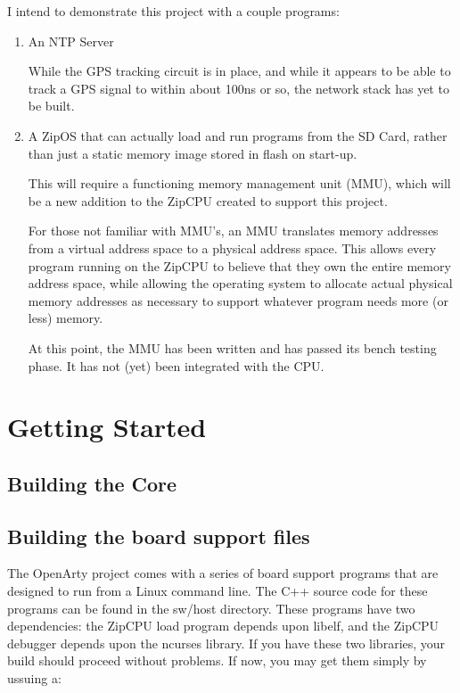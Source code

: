 \documentclass{gqtekspec}
\begin{document}
I intend to demonstrate this project with a couple programs:
\begin{enumerate}
\item An NTP Server

	While the GPS tracking circuit is in place, and while it appears to be
	able to track a GPS signal to within about 100ns or so, the 
	network stack has yet to be built.

\item A ZipOS that can actually load and run programs from the SD Card, rather
	than just a static memory image stored in flash on start-up.

	This will require a functioning memory management unit (MMU), which
	will be a new addition to the ZipCPU created to support this project.

	For those not familiar with MMU's, an MMU translates memory addresses
	from a virtual address space to a physical address space.  This allows
	every program running on the ZipCPU to believe that they own the entire
	memory address space, while allowing the operating system to allocate
	actual physical memory addresses as necessary to support whatever
	program needs more (or less) memory.

	At this point, the MMU has been written and has passed its bench
	testing phase.  It has not (yet) been integrated with the CPU.
\end{enumerate}


\chapter{Getting Started}\label{ch:getting-started}
\section{Building the Core}
%
\section{Building the board support files}
The OpenArty project comes with a series of board support programs that are
designed to run from a Linux command line.  The C++ source code for these
programs can be found in the sw/host directory.  These programs have two
dependencies: the ZipCPU load program depends upon libelf, and the ZipCPU
debugger depends upon the ncurses library.  If you have these two libraries,
your build should proceed without problems.  If now, you may get them simply
by ussuing a:
\begin{lstlisting}[language=bash]
% sudo apt-get install ncurses-dev libelf-dev
\end{lstlisting}
\end{document}
